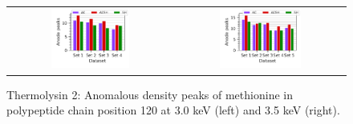 \begin{figure}
    \centering
    \begin{tabular}{cc}
        \includegraphics[width = 0.5\textwidth]{plots/exp1/tlys_2_P6122/peaks/3p0_met120.pdf} & \includegraphics[width = 0.5\textwidth]{plots/exp1/tlys_2_P6122/peaks/3p5_met120.pdf}
    \end{tabular}
    \caption{Thermolysin 2: Anomalous density peaks of methionine  in polypeptide chain position 120 at 3.0 \unit{keV} (left) and 3.5 \unit{keV} (right).}%
    \label{fig:tlys2_met_120_peaks}
\end{figure}



